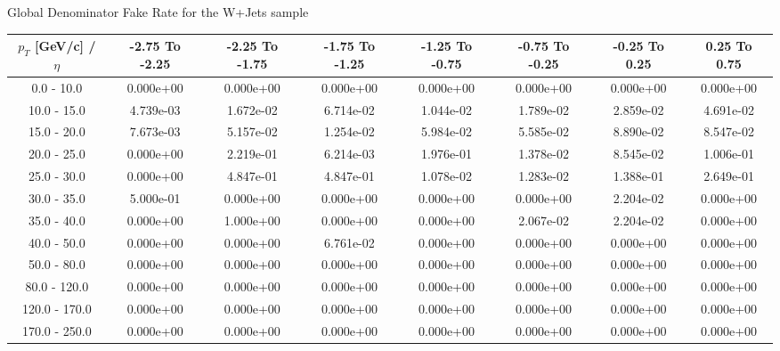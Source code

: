 \large 
Global Denominator Fake Rate for the W+Jets sample
\footnotesize 
\begin{tabular*}{\textwidth}{|c|c|c|c|c|c|c|c|}\hline 
$p_T$ [GeV/c] / $\eta$  & -2.75 To -2.25 & -2.25 To -1.75 & -1.75 To -1.25 & -1.25 To -0.75 & -0.75 To -0.25 & -0.25 To 0.25 & 0.25 To 0.75 \\ 
 \hline 
0.0 - 10.0 & 0.000e+00 & 0.000e+00 & 0.000e+00 & 0.000e+00 & 0.000e+00 & 0.000e+00 & 0.000e+00 \\ 
10.0 - 15.0 & 4.739e-03 & 1.672e-02 & 6.714e-02 & 1.044e-02 & 1.789e-02 & 2.859e-02 & 4.691e-02 \\ 
15.0 - 20.0 & 7.673e-03 & 5.157e-02 & 1.254e-02 & 5.984e-02 & 5.585e-02 & 8.890e-02 & 8.547e-02 \\ 
20.0 - 25.0 & 0.000e+00 & 2.219e-01 & 6.214e-03 & 1.976e-01 & 1.378e-02 & 8.545e-02 & 1.006e-01 \\ 
25.0 - 30.0 & 0.000e+00 & 4.847e-01 & 4.847e-01 & 1.078e-02 & 1.283e-02 & 1.388e-01 & 2.649e-01 \\ 
30.0 - 35.0 & 5.000e-01 & 0.000e+00 & 0.000e+00 & 0.000e+00 & 0.000e+00 & 2.204e-02 & 0.000e+00 \\ 
35.0 - 40.0 & 0.000e+00 & 1.000e+00 & 0.000e+00 & 0.000e+00 & 2.067e-02 & 2.204e-02 & 0.000e+00 \\ 
40.0 - 50.0 & 0.000e+00 & 0.000e+00 & 6.761e-02 & 0.000e+00 & 0.000e+00 & 0.000e+00 & 0.000e+00 \\ 
50.0 - 80.0 & 0.000e+00 & 0.000e+00 & 0.000e+00 & 0.000e+00 & 0.000e+00 & 0.000e+00 & 0.000e+00 \\ 
80.0 - 120.0 & 0.000e+00 & 0.000e+00 & 0.000e+00 & 0.000e+00 & 0.000e+00 & 0.000e+00 & 0.000e+00 \\ 
120.0 - 170.0 & 0.000e+00 & 0.000e+00 & 0.000e+00 & 0.000e+00 & 0.000e+00 & 0.000e+00 & 0.000e+00 \\ 
170.0 - 250.0 & 0.000e+00 & 0.000e+00 & 0.000e+00 & 0.000e+00 & 0.000e+00 & 0.000e+00 & 0.000e+00 \\ 
 \hline 
\end{tabular*} 
